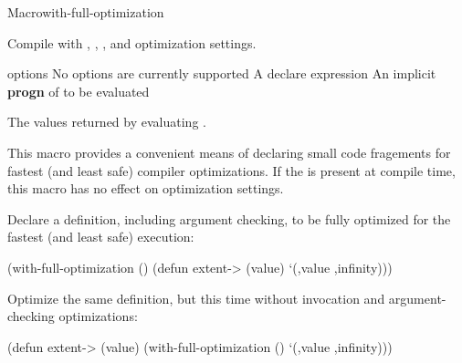 \documentclass[10pt,twoside,english,pdftex]{article}
\begin{document}
\begin{functiondoc}{Macro}{with-full-optimization}%
  {\code{(}\superstar{}\code{)}
    \superstar{}
    \superstar{} \returns{}
    \superstar}
%
  
\fnsyntax

\fnpurpose Compile  with , , , and  optimization
settings.

\fnpackage {}

\fnmodule {}

\fnargs
\begin{args}{options}
\arg[option] No options are currently supported
\arg[declaration] A declare expression
\arg[forms] An implicit \textbf{progn} of  to be evaluated
\end{args}

\fnreturns The values returned by evaluating .

\fndescription
{}%
This macro provides a convenient means of declaring small code fragements for
fastest (and least safe) compiler optimizations.  If the 
\textbf{} is present at compile time, this macro
has no effect on optimization settings.

\fnexamples Declare a  definition, including argument checking,
to be fully optimized for the fastest (and least safe) execution:

\begin{example}
  (with-full-optimization ()
    (defun extent-> (value)
      `(,value ,infinity)))
\end{example}

Optimize the same  definition, but this time without invocation and
argument-checking optimizations:

\begin{example}
  (defun extent-> (value)
    (with-full-optimization ()
      `(,value ,infinity)))
\end{example}

\end{functiondoc}

\end{document}
